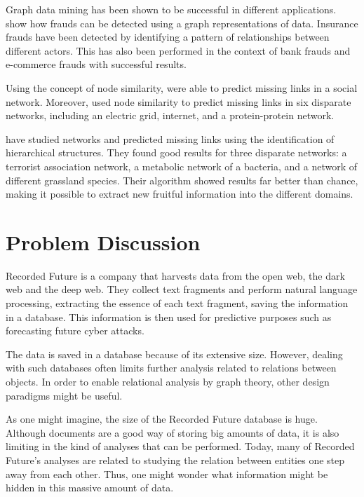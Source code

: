 Graph data mining has been shown to be successful in different applications. \citet{bankFraud} show how frauds can be detected using a graph representations of data. Insurance frauds have been detected by identifying a pattern of relationships between different actors. This has also been performed in the context of bank frauds and e-commerce frauds with successful results. 

Using the concept of node similarity, \citet{Liben-Nowell2003} were able to predict missing links in a social network. Moreover, \citet{Zhou2009} used node similarity to predict missing links in six disparate networks, including an electric grid, internet, and a protein-protein network.

\citet{clauset2008Hierarchicalstructure} have studied networks and predicted missing links using the identification of hierarchical structures. They found good results for three disparate networks: a terrorist association network, a metabolic network of a bacteria, and a network of different grassland species. Their algorithm showed results far better than chance, making it possible to extract new fruitful information into the different domains. 

\section{Problem Discussion}
Recorded Future is a company that harvests data from the open web, the dark web and the deep web. They collect text fragments and perform natural language processing, extracting the essence of each text fragment, saving the information in a database. This information is then used for predictive purposes such as forecasting future cyber attacks.

The data is saved in a database because of its extensive size. However, dealing with such databases often limits further analysis related to relations between objects. In order to enable relational analysis by graph theory, other design paradigms might be useful.

As one might imagine, the size of the Recorded Future database is huge. Although documents are a good way of storing big amounts of data, it is also limiting in the kind of analyses that can be performed. Today, many of Recorded Future's analyses are related to studying the relation between entities one step away from each other. Thus, one might wonder what information might be hidden in this massive amount of data.

